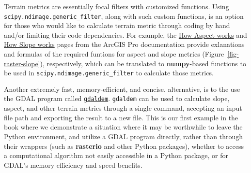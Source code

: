 \documentclass[
  letterpaper,
]{krantz}
\begin{document}
\begin{tcolorbox}[enhanced jigsaw, title=\textcolor{quarto-callout-note-color}{\faInfo}\hspace{0.5em}{Note}, arc=.35mm, toprule=.15mm, titlerule=0mm, colframe=quarto-callout-note-color-frame, breakable, toptitle=1mm, bottomtitle=1mm, rightrule=.15mm, colbacktitle=quarto-callout-note-color!10!white, leftrule=.75mm, left=2mm, bottomrule=.15mm, opacityback=0, coltitle=black, opacitybacktitle=0.6, colback=white]

Terrain metrics are essentially focal filters with customized functions.
Using \texttt{scipy.ndimage.generic\_filter}, along with such custom
functions, is an option for those who would like to calculate terrain
metric through coding by hand and/or limiting their code dependencies.
For example, the
\href{https://pro.arcgis.com/en/pro-app/latest/tool-reference/spatial-analyst/how-aspect-works.htm}{How
Aspect works} and
\href{https://pro.arcgis.com/en/pro-app/latest/tool-reference/spatial-analyst/how-slope-works.htm}{How
Slope works} pages from the ArcGIS Pro documentation provide exlanations
and formulas of the required funtions for aspect and slope metrics
(Figure~\ref{fig-raster-slope}), respectively, which can be translated
to \textbf{numpy}-based functions to be used in
\texttt{scipy.ndimage.generic\_filter} to calculate those metrics.

\end{tcolorbox}

Another extremely fast, memory-efficient, and concise, alternative, is
to the use the GDAL program called
\href{https://gdal.org/programs/gdaldem.html}{\texttt{gdaldem}}.
\texttt{gdaldem} can be used to calculate slope, aspect, and other
terrain metrics through a single command, accepting an input file path
and exporting the result to a new file. This is our first example in the
book where we demonstrate a situation where it may be worthwhile to
leave the Python environment, and utilize a GDAL program directly,
rather than through their wrappers (such as \textbf{rasterio} and other
Python packages), whether to access a computational algorithm not easily
accessible in a Python package, or for GDAL's memory-efficiency and
speed benefits.
\end{document}
